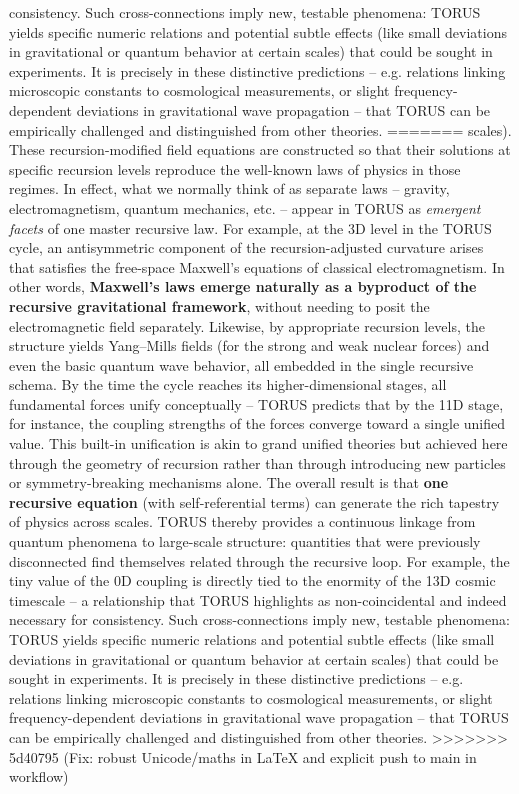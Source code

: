 \documentclass[]{article}
\begin{document}
consistency\hspace{0pt}. Such cross-connections imply new, testable
phenomena: TORUS yields specific numeric relations and potential subtle
effects (like small deviations in gravitational or quantum behavior at
certain scales) that could be sought in experiments\hspace{0pt}. It is
precisely in these distinctive predictions -- e.g. relations linking
microscopic constants to cosmological measurements\hspace{0pt}, or
slight frequency-dependent deviations in gravitational wave propagation
-- that TORUS can be empirically challenged and distinguished from other
theories.
=======
scales)​. These recursion-modified field equations are constructed so
that their solutions at specific recursion levels reproduce the
well-known laws of physics in those regimes. In effect, what we normally
think of as separate laws -- gravity, electromagnetism, quantum
mechanics, etc. -- appear in TORUS as \emph{emergent facets} of one
master recursive law. For example, at the 3D level in the TORUS cycle,
an antisymmetric component of the recursion-adjusted curvature arises
that satisfies the free-space Maxwell's equations of classical
electromagnetism​. In other words, \textbf{Maxwell's laws emerge
naturally as a byproduct of the recursive gravitational framework},
without needing to posit the electromagnetic field separately​.
Likewise, by appropriate recursion levels, the structure yields
Yang--Mills fields (for the strong and weak nuclear forces) and even the
basic quantum wave behavior, all embedded in the single recursive
schema. By the time the cycle reaches its higher-dimensional stages, all
fundamental forces unify conceptually -- TORUS predicts that by the 11D
stage, for instance, the coupling strengths of the forces converge
toward a single unified value​. This built-in unification is akin to
grand unified theories but achieved here through the geometry of
recursion rather than through introducing new particles or
symmetry-breaking mechanisms alone. The overall result is that
\textbf{one recursive equation} (with self-referential terms) can
generate the rich tapestry of physics across scales. TORUS thereby
provides a continuous linkage from quantum phenomena to large-scale
structure: quantities that were previously disconnected find themselves
related through the recursive loop. For example, the tiny value of the
0D coupling \alpha is directly tied to the enormity of the 13D cosmic
timescale -- a relationship that TORUS highlights as non-coincidental
and indeed necessary for consistency​. Such cross-connections imply new,
testable phenomena: TORUS yields specific numeric relations and
potential subtle effects (like small deviations in gravitational or
quantum behavior at certain scales) that could be sought in
experiments​. It is precisely in these distinctive predictions -- e.g.
relations linking microscopic constants to cosmological measurements​,
or slight frequency-dependent deviations in gravitational wave
propagation -- that TORUS can be empirically challenged and
distinguished from other theories.
>>>>>>> 5d40795 (Fix: robust Unicode/maths in LaTeX and explicit push to main in workflow)
\end{document}

